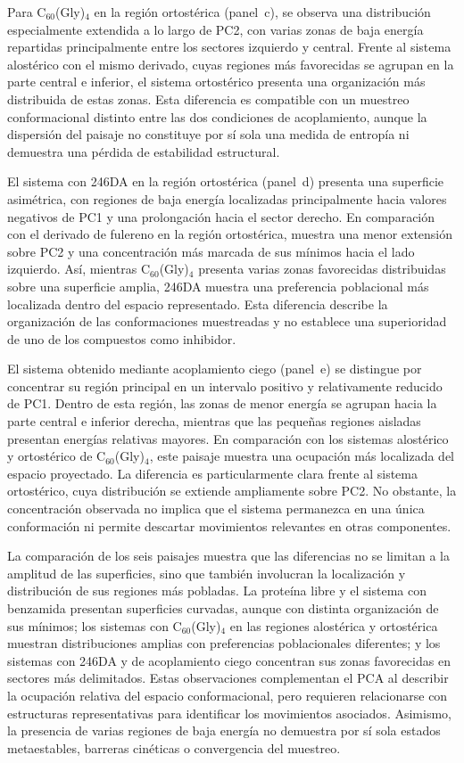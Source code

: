 Para C$_{60}$(Gly)$_4$ en la región ortostérica (panel~c), se observa una distribución especialmente extendida a lo largo de PC2, con varias zonas de baja energía repartidas principalmente entre los sectores izquierdo y central. Frente al sistema alostérico con el mismo derivado, cuyas regiones más favorecidas se agrupan en la parte central e inferior, el sistema ortostérico presenta una organización más distribuida de estas zonas. Esta diferencia es compatible con un muestreo conformacional distinto entre las dos condiciones de acoplamiento, aunque la dispersión del paisaje no constituye por sí sola una medida de entropía ni demuestra una pérdida de estabilidad estructural.

El sistema con 246DA en la región ortostérica (panel~d) presenta una superficie asimétrica, con regiones de baja energía localizadas principalmente hacia valores negativos de PC1 y una prolongación hacia el sector derecho. En comparación con el derivado de fulereno en la región ortostérica, muestra una menor extensión sobre PC2 y una concentración más marcada de sus mínimos hacia el lado izquierdo. Así, mientras C$_{60}$(Gly)$_4$ presenta varias zonas favorecidas distribuidas sobre una superficie amplia, 246DA muestra una preferencia poblacional más localizada dentro del espacio representado. Esta diferencia describe la organización de las conformaciones muestreadas y no establece una superioridad de uno de los compuestos como inhibidor.

El sistema obtenido mediante acoplamiento ciego (panel~e) se distingue por concentrar su región principal en un intervalo positivo y relativamente reducido de PC1. Dentro de esta región, las zonas de menor energía se agrupan hacia la parte central e inferior derecha, mientras que las pequeñas regiones aisladas presentan energías relativas mayores. En comparación con los sistemas alostérico y ortostérico de C$_{60}$(Gly)$_4$, este paisaje muestra una ocupación más localizada del espacio proyectado. La diferencia es particularmente clara frente al sistema ortostérico, cuya distribución se extiende ampliamente sobre PC2. No obstante, la concentración observada no implica que el sistema permanezca en una única conformación ni permite descartar movimientos relevantes en otras componentes.

La comparación de los seis paisajes muestra que las diferencias no se limitan a la amplitud de las superficies, sino que también involucran la localización y distribución de sus regiones más pobladas. La proteína libre y el sistema con benzamida presentan superficies curvadas, aunque con distinta organización de sus mínimos; los sistemas con C$_{60}$(Gly)$_4$ en las regiones alostérica y ortostérica muestran distribuciones amplias con preferencias poblacionales diferentes; y los sistemas con 246DA y de acoplamiento ciego concentran sus zonas favorecidas en sectores más delimitados. Estas observaciones complementan el PCA al describir la ocupación relativa del espacio conformacional, pero requieren relacionarse con estructuras representativas para identificar los movimientos asociados. Asimismo, la presencia de varias regiones de baja energía no demuestra por sí sola estados metaestables, barreras cinéticas o convergencia del muestreo.

